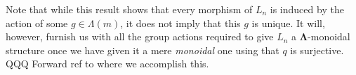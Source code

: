 \documentclass{amsbook} %
\newcommand{\ML}{\mathbf{\Lambda}}
\newcommand{\ELn}{E\Lambda(\underline{n})}
\newcommand{\ELnn}{E\Lambda(\underline{2n})}
\numberwithin{section}{chapter}
\begin{document}
Note that while this result shows that every morphism of $L_n$ is induced by the action of some $g \in \Lambda(m)$, it does not imply that this $g$ is unique. It will, however, furnish us with all the group actions required to give $L_n$ a $\ML$-monoidal structure once we have given it a mere \emph{monoidal} one using that $q$ is surjective.  QQQ Forward ref to where we accomplish this.

\end{document}
